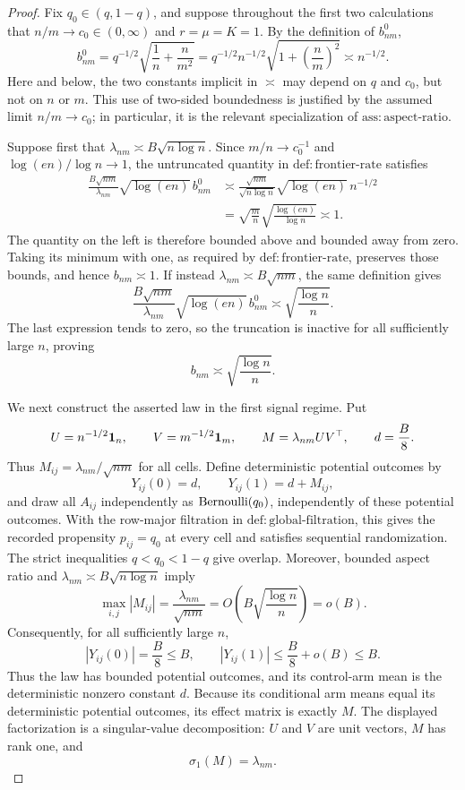 \documentclass{article}
\begin{document}
\begin{proof}
Fix \(q_0\in(q,1-q)\), and suppose throughout the first two calculations that \(n/m\to c_0\in(0,\infty)\) and \(r=\mu=K=1\).  By the definition of \(b^0_{nm}\),
\[
 b^0_{nm}
 =q^{-1/2}\sqrt{\frac1n+\frac{n}{m^2}}
 =q^{-1/2}n^{-1/2}\sqrt{1+\left(\frac nm\right)^2}
 \asymp n^{-1/2}.
\]
Here and below, the two constants implicit in \(\asymp\) may depend on \(q\) and \(c_0\), but not on \(n\) or \(m\).  This use of two-sided boundedness is justified by the assumed limit \(n/m\to c_0\); in particular, it is the relevant specialization of \(\mathrm{ass:aspect\mbox{-}ratio}\).

Suppose first that \(\lambda_{nm}\asymp B\sqrt{n\log n}\).  Since \(m/n\to c_0^{-1}\) and \(\log(en)/\log n\to1\), the untruncated quantity in \(\mathrm{def:frontier\mbox{-}rate}\) satisfies
\[
 \begin{aligned}
 \frac{B\sqrt{nm}}{\lambda_{nm}}\sqrt{\log(en)}\,b^0_{nm}
 &\asymp
 \frac{\sqrt{nm}}{\sqrt{n\log n}}
 \sqrt{\log(en)}\,n^{-1/2}\\
 &=\sqrt{\frac mn}\sqrt{\frac{\log(en)}{\log n}}
 \asymp1.
 \end{aligned}
\]
The quantity on the left is therefore bounded above and bounded away from zero.  Taking its minimum with one, as required by \(\mathrm{def:frontier\mbox{-}rate}\), preserves those bounds, and hence \(b_{nm}\asymp1\).  If instead \(\lambda_{nm}\asymp B\sqrt{nm}\), the same definition gives
\[
 \frac{B\sqrt{nm}}{\lambda_{nm}}\sqrt{\log(en)}\,b^0_{nm}
 \asymp\sqrt{\frac{\log n}{n}}.
\]
The last expression tends to zero, so the truncation is inactive for all sufficiently large \(n\), proving
\[
 b_{nm}\asymp\sqrt{\frac{\log n}{n}}.
\]

We next construct the asserted law in the first signal regime.  Put
\[
 U=n^{-1/2}{\bf 1}_n,
 \qquad
 V=m^{-1/2}{\bf 1}_m,
 \qquad
 M=\lambda_{nm}UV^\top,
 \qquad
 d=\frac B8.
\]
Thus \(M_{ij}=\lambda_{nm}/\sqrt{nm}\) for all cells.  Define deterministic potential outcomes by
\[
 Y_{ij}(0)=d,
 \qquad
 Y_{ij}(1)=d+M_{ij},
\]
and draw all \(A_{ij}\) independently as \({\rm Bernoulli}(q_0)\), independently of these potential outcomes.  With the row-major filtration in \(\mathrm{def:global\mbox{-}filtration}\), this gives the recorded propensity \(p_{ij}=q_0\) at every cell and satisfies sequential randomization.  The strict inequalities \(q<q_0<1-q\) give overlap.  Moreover, bounded aspect ratio and \(\lambda_{nm}\asymp B\sqrt{n\log n}\) imply
\[
 \max_{i,j}|M_{ij}|
 =\frac{\lambda_{nm}}{\sqrt{nm}}
 =O\!\left(B\sqrt{\frac{\log n}{n}}\right)
 =o(B).
\]
Consequently, for all sufficiently large \(n\),
\[
 |Y_{ij}(0)|=\frac B8\le B,
 \qquad
 |Y_{ij}(1)|\le\frac B8+o(B)\le B.
\]
Thus the law has bounded potential outcomes, and its control-arm mean is the deterministic nonzero constant \(d\).  Because its conditional arm means equal its deterministic potential outcomes, its effect matrix is exactly \(M\).  The displayed factorization is a singular-value decomposition: \(U\) and \(V\) are unit vectors, \(M\) has rank one, and
\[
 \sigma_1(M)=\lambda_{nm}.
\]


\end{proof}
\end{document}
